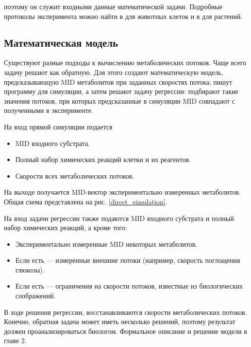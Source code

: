 \documentclass[14pt, a4paper]{extreport}
\begin{document}
 поэтому он служит входными данные математической задачи. Подробные протоколы эксперимента можно найти в \cite{protocol_animal} для животных клеток и в \cite{protocol_plant} для растений.


\subsection{Математическая модель}
Существуют разные подходы к вычислению метаболических потоков. Чаще всего задачу решают как обратную. Для этого создают математическую модель, предсказывающую MID метаболитов при заданных скоростях потока; пишут программу для симуляции, а затем решают задачу регрессии: подбирают такие значения потоков, при которых предсказанные в симуляции MID совпадают с полученными в эксперименте. 

На вход прямой симуляции подается 
\begin{itemize}
	\item MID входного субстрата.
	\item Полный набор химических реакций клетки и их реагентов.
	\item Скорости всех метаболических потоков.
\end{itemize}
На выходе получается MID-вектор экспериментально измеренных метаболитов. Общая схема представлена на рис. \ref{direct_simulation}.


На вход задачи регрессии также подаются MID входного субстрата и полный набор химических реакций, а кроме того:
\begin{itemize}
	\item Экспериментально измеренные MID некоторых метаболитов.
	\item Если есть --- измеренные внешние потоки (например, скорость поглощения глюкозы).
	\item Если есть --- ограничения на скорости потоков, известные из биологических соображений.
\end{itemize} 
В ходе решения регрессии, восстанавливаются скорости метаболических потоков. Конечно, обратная задача может иметь несколько решений, поэтому результат должен проанализироваться биологом. Формальное описание и решение модели в главе 2.
\end{document}
